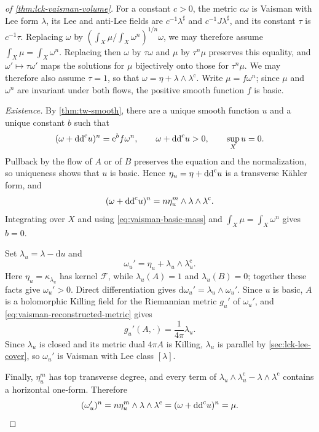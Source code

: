 \begin{proof}[of \cref{thm:lck-vaisman-volume}]
For a constant $c>0$, the metric $c\omega$ is Vaisman with Lee form $\lambda$, its Lee and anti-Lee fields are $c^{-1}\lambda^\sharp$ and $c^{-1}J\lambda^\sharp$, and its constant $\tau$ is $c^{-1}\tau$. Replacing $\omega$ by $(\int_X\mu/\int_X\omega^n)^{1/n}\omega$, we may therefore assume $\int_X\mu=\int_X\omega^n$. Replacing then $\omega$ by $\tau\omega$ and $\mu$ by $\tau^n\mu$ preserves this equality, and $\omega'\mapsto\tau\omega'$ maps the solutions for $\mu$ bijectively onto those for $\tau^n\mu$. We may therefore also assume $\tau=1$, so that $\omega=\eta+\lambda\wedge\lambda^{\mathrm c}$. Write $\mu=f\omega^n$; since $\mu$ and $\omega^n$ are invariant under both flows, the positive smooth function $f$ is basic.

\emph{Existence.} By \cref{thm:tw-smooth}, there are a unique smooth function $u$ and a unique constant $b$ such that
\[
 (\omega+\mathrm{dd}^{\mathrm{c}} u)^n=\mathrm{e}^b f\omega^n,
 \qquad \omega+\mathrm{dd}^{\mathrm{c}} u>0,\qquad \sup_Xu=0.
\]
Pullback by the flow of $A$ or of $B$ preserves the equation and the normalization, so uniqueness shows that $u$ is basic. Hence $\eta_u=\eta+\mathrm{dd}^{\mathrm{c}} u$ is a transverse K\"ahler form, and
\[
 (\omega+\mathrm{dd}^{\mathrm{c}} u)^n=n\eta_u^m\wedge\lambda\wedge\lambda^{\mathrm c}.
\]
Integrating over $X$ and using \eqref{eq:vaisman-basic-mass} and $\int_X\mu=\int_X\omega^n$ gives $b=0$.

Set $\lambda_u=\lambda-\mathrm{d}u$ and
\begin{equation}\label{eq:vaisman-reconstructed-metric}
 \omega_u'=\eta_u+\lambda_u\wedge\lambda_u^{\mathrm c}.
\end{equation}
Here $\eta_u=\kappa_{\lambda_u}$ has kernel $\mathcal F$, while $\lambda_u(A)=1$ and $\lambda_u(B)=0$; together these facts give $\omega_u'>0$. Direct differentiation gives $\mathrm{d}\omega_u'=\lambda_u\wedge\omega_u'$. Since $u$ is basic, $A$ is a holomorphic Killing field for the Riemannian metric $g_u'$ of $\omega_u'$, and \eqref{eq:vaisman-reconstructed-metric} gives
\[
 g_u'(A,\cdot)=\frac1{4\pi}\lambda_u.
\]
Since $\lambda_u$ is closed and its metric dual $4\pi A$ is Killing, $\lambda_u$ is parallel by \cref{sec:lck-lee-cover}, so $\omega_u'$ is Vaisman with Lee class $[\lambda]$.

Finally, $\eta_u^m$ has top transverse degree, and every term of $\lambda_u\wedge\lambda_u^{\mathrm c}-\lambda\wedge\lambda^{\mathrm c}$ contains a horizontal one-form. Therefore
\[
 (\omega_u')^n
 =n\eta_u^m\wedge\lambda\wedge\lambda^{\mathrm c}
 =(\omega+\mathrm{dd}^{\mathrm{c}} u)^n=\mu.
\]


\end{proof}
